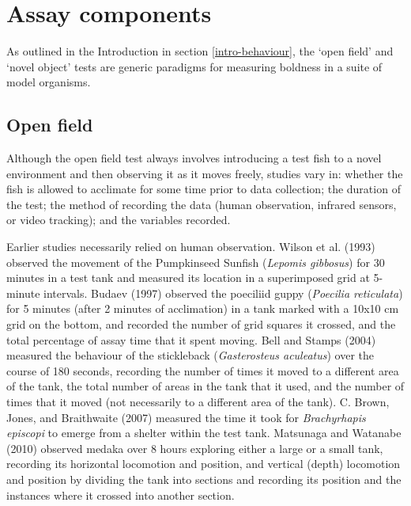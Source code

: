 \documentclass[
]{book}
\begin{document}
\hypertarget{assay-components}{%
\section{Assay components}\label{assay-components}}

As outlined in the Introduction in section \ref{intro-behaviour}, the `open field' and `novel object' tests are generic paradigms for measuring boldness in a suite of model organisms.

\hypertarget{open-field}{%
\subsection{Open field}\label{open-field}}

Although the open field test always involves introducing a test fish to a novel environment and then observing it as it moves freely, studies vary in: whether the fish is allowed to acclimate for some time prior to data collection; the duration of the test; the method of recording the data (human observation, infrared sensors, or video tracking); and the variables recorded.

Earlier studies necessarily relied on human observation. Wilson et al. (1993) observed the movement of the Pumpkinseed Sunfish (\emph{Lepomis gibbosus}) for 30 minutes in a test tank and measured its location in a superimposed grid at 5-minute intervals. Budaev (1997) observed the poeciliid guppy (\emph{Poecilia reticulata}) for 5 minutes (after 2 minutes of acclimation) in a tank marked with a 10x10 cm grid on the bottom, and recorded the number of grid squares it crossed, and the total percentage of assay time that it spent moving. Bell and Stamps (2004) measured the behaviour of the stickleback (\emph{Gasterosteus aculeatus}) over the course of 180 seconds, recording the number of times it moved to a different area of the tank, the total number of areas in the tank that it used, and the number of times that it moved (not necessarily to a different area of the tank). C. Brown, Jones, and Braithwaite (2007) measured the time it took for \emph{Brachyrhapis episcopi} to emerge from a shelter within the test tank. Matsunaga and Watanabe (2010) observed medaka over 8 hours exploring either a large or a small tank, recording its horizontal locomotion and position, and vertical (depth) locomotion and position by dividing the tank into sections and recording its position and the instances where it crossed into another section.
\end{document}
